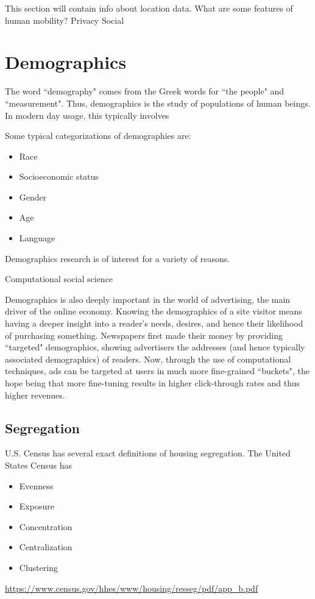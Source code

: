 \documentclass[12pt]{article}
\begin{document}
This section will contain info about location data.
What are some features of human mobility?
Privacy
Social


\section{Demographics}
\label{sec:demo}
The word ``demography" comes from the Greek words for ``the people" and ``measurement".
Thus, demographics is the study of populations of human beings.
In modern day usage, this typically involves 

Some typical categorizations of demographies are:
\begin{itemize}
  \item Race
  \item Socioeconomic status
  \item Gender
  \item Age
  \item Language
\end{itemize}

Demographics research is of interest for a variety of reasons.

Computational social science %

Demographics is also deeply important in the world of advertising, the main driver of the online economy.
Knowing the demographics of a site visitor means having a deeper insight into a reader's needs, desires, and hence their likelihood of purchasing something.
Newspapers first made their money by providing ``targeted" demographics, showing advertisers the addresses (and hence typically associated demographics) of readers.
Now, through the use of computational techniques, ads can be targeted at users in much more fine-grained ``buckets", the hope being that more fine-tuning results in higher click-through rates and thus higher revenues.


\subsection{Segregation}
U.S. Census has several exact definitions of housing segregation.
The United States Census has 
\begin{itemize}
  \item Evenness
  \item Exposure
  \item Concentration
  \item Centralization
  \item Clustering
\end{itemize}
\url{https://www.census.gov/hhes/www/housing/resseg/pdf/app_b.pdf}
\end{document}

